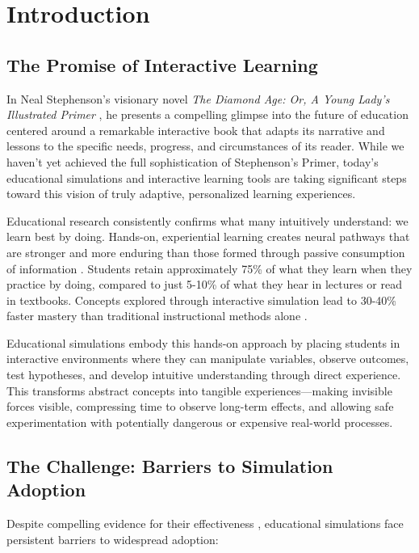 \section{Introduction}

\subsection{The Promise of Interactive Learning}

In Neal Stephenson's visionary novel \textit{The Diamond Age: Or, A Young Lady's Illustrated Primer} \cite{stephenson1995}, he presents a compelling glimpse into the future of education centered around a remarkable interactive book that adapts its narrative and lessons to the specific needs, progress, and circumstances of its reader. While we haven't yet achieved the full sophistication of Stephenson's Primer, today's educational simulations and interactive learning tools are taking significant steps toward this vision of truly adaptive, personalized learning experiences.

Educational research consistently confirms what many intuitively understand: we learn best by doing. Hands-on, experiential learning creates neural pathways that are stronger and more enduring than those formed through passive consumption of information \cite{freeman2014active, prince2004active}. Students retain approximately 75\% of what they learn when they practice by doing, compared to just 5-10\% of what they hear in lectures or read in textbooks. Concepts explored through interactive simulation lead to 30-40\% faster mastery than traditional instructional methods alone \cite{wieman2008phet, rutten2012learning}.

Educational simulations embody this hands-on approach by placing students in interactive environments where they can manipulate variables, observe outcomes, test hypotheses, and develop intuitive understanding through direct experience. This transforms abstract concepts into tangible experiences—making invisible forces visible, compressing time to observe long-term effects, and allowing safe experimentation with potentially dangerous or expensive real-world processes.

\subsection{The Challenge: Barriers to Simulation Adoption}

Despite compelling evidence for their effectiveness \cite{dangelo2014simulations, merchant2014effectiveness}, educational simulations face persistent barriers to widespread adoption:

